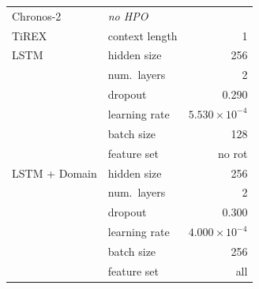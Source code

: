 \begin{table}[h]
\begin{tabular}{llr}
            \midrule
            Chronos-2
              & \multicolumn{2}{l}{\textit{no HPO}} \\
            TiREX
              & context length            & 1\\
            \midrule
            LSTM
              & hidden size               & 256 \\
              & num.\ layers              & 2 \\
              & dropout                   & 0.290 \\
              & learning rate             & $5.530 \times 10^{-4}$ \\
              & batch size                & 128 \\
              & feature set               & no rot\\%
              \midrule
            LSTM + Domain
              & hidden size               & 256 \\
              & num.\ layers              & 2 \\
              & dropout                   & 0.300 \\
              & learning rate             & $4.000 \times 10^{-4}$ \\
              & batch size                & 256 \\
              & feature set               & all\\%
            \bottomrule
            \bottomrule
            \end{tabular}
            \end{table}

